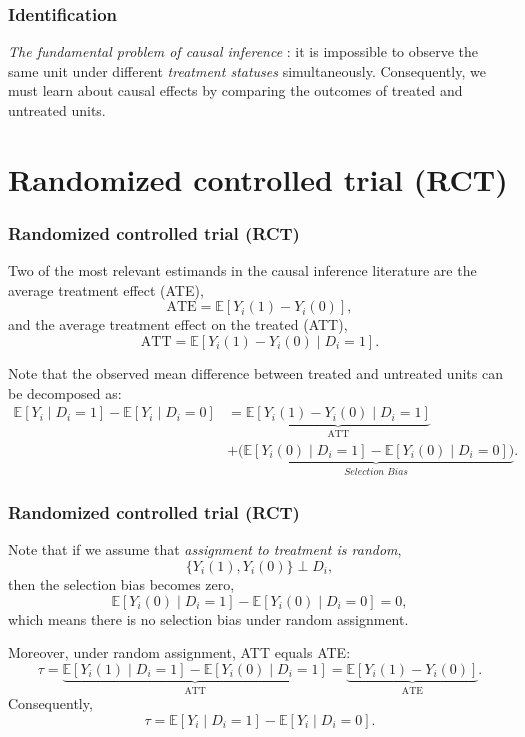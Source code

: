 \documentclass[12pt, compress]{beamer}
\begin{document}
\begin{frame}
	\frametitle{Identification}
\textit{The fundamental problem of causal inference} \citep{holland1986statistics}: it is impossible to observe the same unit under different \textit{treatment statuses} simultaneously. Consequently, we must learn about causal effects by comparing the outcomes of treated and untreated units.
\end{frame}

\section{Randomized controlled trial (RCT)}

\begin{frame}
	\frametitle{Randomized controlled trial (RCT)}
Two of the most relevant estimands in the causal inference literature are the average treatment effect (ATE),
\[
\text{ATE} = \mathbb{E}[Y_i(1) - Y_i(0)],
\]
and the average treatment effect on the treated (ATT),
\[
\text{ATT} = \mathbb{E}[Y_i(1) - Y_i(0) \mid D_i = 1].
\]

Note that the observed mean difference between treated and untreated units can be decomposed as:
{\footnotesize{
\begin{align*}
\mathbb{E}[Y_i \mid D_i = 1] - \mathbb{E}[Y_i \mid D_i = 0] 
& = \underbrace{\mathbb{E}[Y_i(1) - Y_i(0) \mid D_i = 1]}_{\text{ATT}}\\
& + \underbrace{\Big( \mathbb{E}[Y_i(0) \mid D_i = 1] - \mathbb{E}[Y_i(0) \mid D_i = 0]\Big)}_{\textit{Selection Bias}}.
\end{align*}
}}
\end{frame}

\begin{frame}
	\frametitle{Randomized controlled trial (RCT)}
Note that if we assume that \textit{assignment to treatment is random},
\[
\{ Y_i(1), Y_i(0) \} \perp D_i,
\]
then the selection bias becomes zero,
\[
\mathbb{E}[Y_i(0) \mid D_i = 1] - \mathbb{E}[Y_i(0) \mid D_i = 0] = 0,
\]
which means there is no selection bias under random assignment.

Moreover, under random assignment, ATT equals ATE:
\[
\tau = \underbrace{\mathbb{E}[Y_i(1)\mid D_i=1]-\mathbb{E}[Y_i(0)\mid D_i=1]}_{\text{ATT}} 
= \underbrace{\mathbb{E}[Y_i(1)-Y_i(0)]}_{\text{ATE}}.
\]
Consequently,
\begin{equation*}
	\tau=\mathbb{E}[Y_i \mid D_i = 1] - \mathbb{E}[Y_i \mid D_i = 0].
\end{equation*}
\end{frame}
\end{document}
